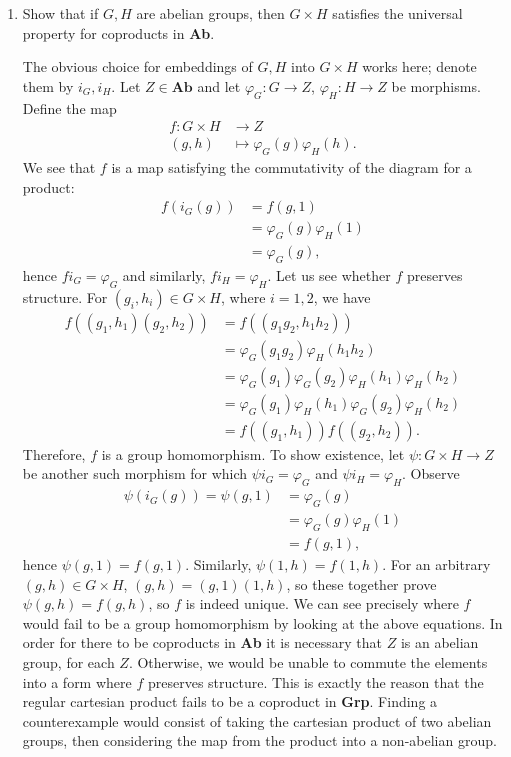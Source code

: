 \documentclass[12pt]{article}
\begin{document}
\begin{enumerate}
\item Show that if $ G, H $ are abelian groups, then $ G \times H $ satisfies the universal property for coproducts in \textbf{Ab}.

\begin{solution}
The obvious choice for embeddings of $ G, H $ into $ G \times H $ works here; denote them by $ i_G, i_H $. Let $ Z \in \textbf{Ab}$ and let $  \varphi_G : G \to Z$, $ \varphi_H : H \to Z$ be morphisms. Define the map
\begin{align*}
	f : G \times H & \to  Z\\
	(g, h)& \mapsto \varphi_G(g) \varphi_H(h).
\end{align*}
We see that $ f $ is a map satisfying the commutativity of the diagram for a product:
\begin{align*}
	f(i_G(g)) &= f(g, 1)\\
			&= \varphi_G(g) \varphi_H(1)\\
			&= \varphi_G(g),
\end{align*}
hence $ f i_G = \varphi_G $ and similarly, $ f i_H = \varphi_H $. Let us see whether $ f $ preserves structure. For $ (g_i, h_i) \in G \times H $, where $ i = 1, 2 $, we have
\begin{align*}
	f((g_1, h_1) (g_2, h_2)) &= f((g_1 g_2, h_1 h_2))\\
	&= \varphi_G(g_1 g_2) \varphi_H(h_1 h_2)\\
	&= \varphi_G(g_1) \varphi_G(g_2) \varphi_H(h_1) \varphi_H(h_2)\\
	&= \varphi_G(g_1) \varphi_H(h_1) \varphi_G(g_2) \varphi_H(h_2)\\
	&= f((g_1, h_1)) f((g_2, h_2)).
\end{align*}
Therefore, $ f $ is a group homomorphism. To show existence, let $ \psi : G \times H \to Z$ be another such morphism for which $ \psi i_G = \varphi_G $ and $ \psi i_H = \varphi_H $. Observe
\begin{align*}
	\psi(i_G(g)) = \psi (g, 1) &= \varphi_G(g)\\
	&= \varphi_G(g) \varphi_H(1)\\
	&= f(g, 1),
\end{align*}
hence $ \psi(g, 1) = f(g, 1) $. Similarly, $ \psi(1, h) = f(1, h) $. For an arbitrary $ (g, h) \in G \times H $, $ (g, h) = (g, 1) (1, h) $, so these together prove $ \psi(g, h) = f(g, h) $, so $ f $ is indeed unique.
We can see precisely where $ f $ would fail to be a group homomorphism by looking at the above equations. In order for there to be coproducts in \textbf{Ab} it is necessary that $ Z $ is an abelian group, for each $ Z $. Otherwise, we would be unable to commute the elements into a form where $ f $ preserves structure. This is exactly the reason that the regular cartesian product fails to be a coproduct in \textbf{Grp}. Finding a counterexample would consist of taking the cartesian product of two abelian groups, then considering the map from the product into a non-abelian group.
\end{solution}


\end{enumerate}
\end{document}
